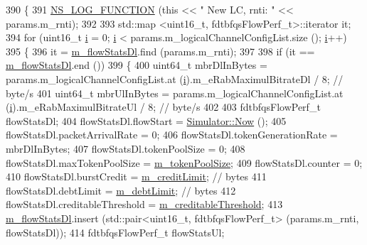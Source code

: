\begin{DoxyCode}
390 \{
391   \hyperlink{log-macros-disabled_8h_a90b90d5bad1f39cb1b64923ea94c0761}{NS\_LOG\_FUNCTION} (\textcolor{keyword}{this} << \textcolor{stringliteral}{" New LC, rnti: "}  << params.m\_rnti);
392 
393   std::map <uint16\_t, fdtbfqsFlowPerf\_t>::iterator it;
394   \textcolor{keywordflow}{for} (uint16\_t \hyperlink{bernuolliDistribution_8m_a6f6ccfcf58b31cb6412107d9d5281426}{i} = 0; \hyperlink{bernuolliDistribution_8m_a6f6ccfcf58b31cb6412107d9d5281426}{i} < params.m\_logicalChannelConfigList.size (); \hyperlink{bernuolliDistribution_8m_a6f6ccfcf58b31cb6412107d9d5281426}{i}++)
395     \{
396       it = \hyperlink{classns3_1_1FdTbfqFfMacScheduler_ad55ff3305031aa6d2b3d351145754972}{m\_flowStatsDl}.find (params.m\_rnti);
397 
398       \textcolor{keywordflow}{if} (it == \hyperlink{classns3_1_1FdTbfqFfMacScheduler_ad55ff3305031aa6d2b3d351145754972}{m\_flowStatsDl}.end ())
399         \{
400           uint64\_t mbrDlInBytes = params.m\_logicalChannelConfigList.at (\hyperlink{bernuolliDistribution_8m_a6f6ccfcf58b31cb6412107d9d5281426}{i}).m\_eRabMaximulBitrateDl / 8;   \textcolor{comment}{
      // byte/s}
401           uint64\_t mbrUlInBytes = params.m\_logicalChannelConfigList.at (\hyperlink{bernuolliDistribution_8m_a6f6ccfcf58b31cb6412107d9d5281426}{i}).m\_eRabMaximulBitrateUl / 8;   \textcolor{comment}{
      // byte/s}
402 
403           fdtbfqsFlowPerf\_t flowStatsDl;
404           flowStatsDl.flowStart = \hyperlink{classns3_1_1Simulator_ac3178fa975b419f7875e7105be122800}{Simulator::Now} ();
405           flowStatsDl.packetArrivalRate = 0;
406           flowStatsDl.tokenGenerationRate =  mbrDlInBytes;
407           flowStatsDl.tokenPoolSize = 0;
408           flowStatsDl.maxTokenPoolSize = \hyperlink{classns3_1_1FdTbfqFfMacScheduler_a0f729f9c65abdbcd28f36269f501fe14}{m\_tokenPoolSize};
409           flowStatsDl.counter = 0;
410           flowStatsDl.burstCredit = \hyperlink{classns3_1_1FdTbfqFfMacScheduler_aa390b2d541c6190fd44f6457fe006a38}{m\_creditLimit}; \textcolor{comment}{// bytes}
411           flowStatsDl.debtLimit = \hyperlink{classns3_1_1FdTbfqFfMacScheduler_aa73b1800df86289d9a1fc49886c9a175}{m\_debtLimit}; \textcolor{comment}{// bytes}
412           flowStatsDl.creditableThreshold = \hyperlink{classns3_1_1FdTbfqFfMacScheduler_a581771a634fa44e3e817131accd9db1f}{m\_creditableThreshold};
413           \hyperlink{classns3_1_1FdTbfqFfMacScheduler_ad55ff3305031aa6d2b3d351145754972}{m\_flowStatsDl}.insert (std::pair<uint16\_t, fdtbfqsFlowPerf\_t> (params.m\_rnti, 
      flowStatsDl));
414           fdtbfqsFlowPerf\_t flowStatsUl;

\end{DoxyCode}
